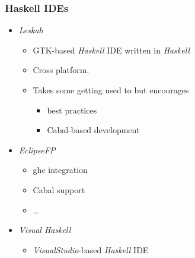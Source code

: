 \begin{frame}
  \frametitle{Haskell IDEs}
  \begin{itemize}
    \item \emph{Leskah}
      \begin{itemize}
        \item GTK-based \emph{Haskell} IDE written in \emph{Haskell}
        \item Cross platform.
        \item Takes some getting used to but encourages 
          \begin{itemize}
            \item best practices 
            \item Cabal-based development
          \end{itemize}
      \end{itemize}
	\item \emph{EclipseFP}      
	  \begin{itemize}
	    \item ghc integration
	    \item Cabal support
	    \item \ldots
	  \end{itemize}
	\item \emph{Visual Haskell}
	  \begin{itemize}
	    \item \emph{VisualStudio}-based \emph{Haskell} IDE
	  \end{itemize}    
  \end{itemize}
\end{frame}